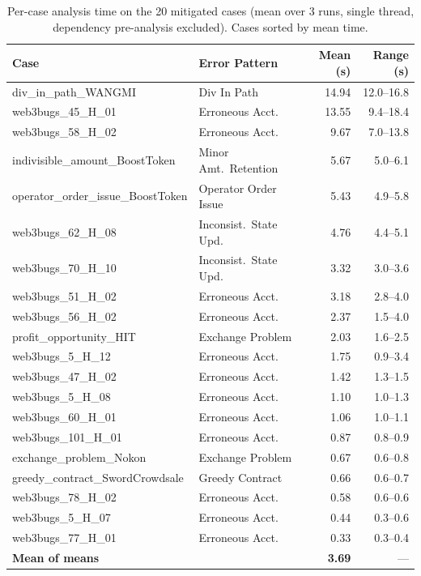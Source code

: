 \documentclass[pdflatex,sn-basic]{sn-jnl}%
\theoremstyle{thmstyleone}%
\theoremstyle{thmstyletwo}%
\theoremstyle{thmstylethree}%
\begin{document}
\begin{table}[t]
\centering
\caption{Per-case analysis time on the 20 mitigated cases (mean over 3 runs, single thread, dependency pre-analysis excluded). Cases sorted by mean time.}
\label{tab:rq1-timing}
\small
\begin{tabular}{l l r r}
\toprule
\textbf{Case} & \textbf{Error Pattern} & \textbf{Mean (s)} & \textbf{Range (s)} \\
\midrule
div\_in\_path\_WANGMI             & Div In Path              & 14.94 & 12.0--16.8 \\
web3bugs\_45\_H\_01               & Erroneous Acct.          & 13.55 & 9.4--18.4  \\
web3bugs\_58\_H\_02               & Erroneous Acct.          &  9.67 & 7.0--13.8  \\
indivisible\_amount\_BoostToken   & Minor Amt.\ Retention    &  5.67 & 5.0--6.1   \\
operator\_order\_issue\_BoostToken& Operator Order Issue      &  5.43 & 4.9--5.8   \\
web3bugs\_62\_H\_08               & Inconsist.\ State Upd.   &  4.76 & 4.4--5.1   \\
web3bugs\_70\_H\_10               & Inconsist.\ State Upd.   &  3.32 & 3.0--3.6   \\
web3bugs\_51\_H\_02               & Erroneous Acct.          &  3.18 & 2.8--4.0   \\
web3bugs\_56\_H\_02               & Erroneous Acct.          &  2.37 & 1.5--4.0   \\
profit\_opportunity\_HIT          & Exchange Problem         &  2.03 & 1.6--2.5   \\
web3bugs\_5\_H\_12                & Erroneous Acct.          &  1.75 & 0.9--3.4   \\
web3bugs\_47\_H\_02               & Erroneous Acct.          &  1.42 & 1.3--1.5   \\
web3bugs\_5\_H\_08                & Erroneous Acct.          &  1.10 & 1.0--1.3   \\
web3bugs\_60\_H\_01               & Erroneous Acct.          &  1.06 & 1.0--1.1   \\
web3bugs\_101\_H\_01              & Erroneous Acct.          &  0.87 & 0.8--0.9   \\
exchange\_problem\_Nokon          & Exchange Problem         &  0.67 & 0.6--0.8   \\
greedy\_contract\_SwordCrowdsale  & Greedy Contract          &  0.66 & 0.6--0.7   \\
web3bugs\_78\_H\_02               & Erroneous Acct.          &  0.58 & 0.6--0.6   \\
web3bugs\_5\_H\_07                & Erroneous Acct.          &  0.44 & 0.3--0.6   \\
web3bugs\_77\_H\_01               & Erroneous Acct.          &  0.33 & 0.3--0.4   \\
\midrule
\textbf{Mean of means} & & \textbf{3.69} & --- \\
\bottomrule
\end{tabular}
\end{table}
\end{document}

